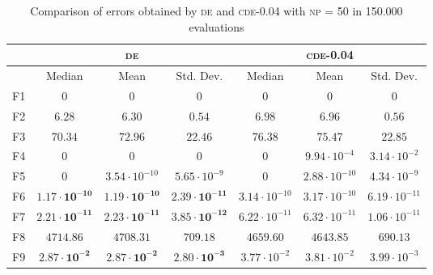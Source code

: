 \begin{table}[!t]
\caption{Comparison of errors obtained by \textsc{de} and \textsc{cde}-0.04 with \textsc{np} = 50 in 150.000 evaluations}
\label{tab:pop_50}
\centering
\begin{scriptsize}
\begin{tabular}{c || c c c | c c c }
\hline
 & \multicolumn{3}{|c|}{\textsc{de}} & \multicolumn{3}{|c}{\textsc{cde-0.04}} \\ \hline
    & Median                         & Mean                             & Std. Dev.                        & Median                & Mean                  & Std. Dev.             \\ \hline
F1  & $0$                            & $0$                              & $0$                              & $0$                   & $0$                   & $0$                   \\ \hline
F2  & $\mathbf{6.28}$                & $\mathbf{6.30}$                  & $\mathbf{0.54}$                  & $6.98$                & $6.96$                & $0.56$                \\ \hline
F3  & $\mathbf{70.34}$               & $\mathbf{72.96}$                 & $\mathbf{22.46}$                 & $76.38$               & $75.47$               & $22.85$               \\ \hline
F4  & $0$                            & $0$                              & $0$                              & $0$                   & $9.94 \cdot 10^{-4}$  & $3.14 \cdot 10^{-2}$  \\ \hline
F5  & $0$                            & $3.54 \cdot 10^{-10}$            & $5.65 \cdot 10^{-9}$             & $0$                   & $2.88 \cdot 10^{-10}$ & $4.34 \cdot 10^{-9}$  \\ \hline
F6  & $\mathbf{1.17 \cdot 10^{-10}}$ & $\mathbf{1.19 \cdot 10^{-10}}$   & $\mathbf{2.39 \cdot 10^{-11}}$   & $3.14 \cdot 10^{-10}$ & $3.17 \cdot 10^{-10}$ & $6.19 \cdot 10^{-11}$ \\ \hline
F7  & $\mathbf{2.21 \cdot 10^{-11}}$ & $\mathbf{2.23 \cdot 10^{-11}}$   & $\mathbf{3.85 \cdot 10^{-12}}$   & $6.22 \cdot 10^{-11}$ & $6.32 \cdot 10^{-11}$ & $1.06 \cdot 10^{-11}$ \\ \hline
F8  & $4714.86$                      & $4708.31$                        & $709.18$                         & $\mathbf{4659.60}$    & $\mathbf{4643.85}$    & $\mathbf{690.13}$     \\ \hline
F9  & $\mathbf{2.87 \cdot 10^{-2}}$  & $\mathbf{2.87 \cdot 10^{-2}}$    & $\mathbf{2.80 \cdot 10^{-3}}$    & $3.77 \cdot 10^{-2}$  & $3.81 \cdot 10^{-2}$  & $3.99 \cdot 10^{-3}$  \\ \hline

\end{tabular}
\end{scriptsize}
\end{table}

